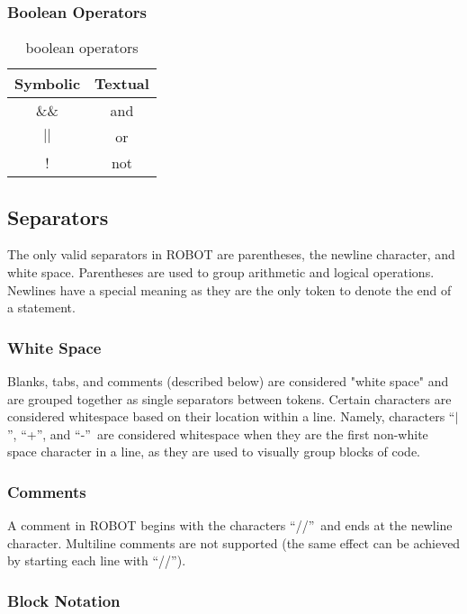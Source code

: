 \documentclass[a4paper]{article}
\newcommand{\og}{``}
\newcommand{\fg}{''}
\begin{document}
\pagebreak

\subsubsection{Boolean Operators}

\begin{table}[h!]
	\centering
	\begin{tabular}{|c|c|}
		\hline
		Symbolic & Textual\\
		\hline
		\&\& & and\\
		\hline
		$\vert\vert$ & or\\
		\hline
		! & not\\
		\hline
	\end{tabular}
	\caption{boolean operators}
\end{table}

\subsection{Separators}

The only valid separators in ROBOT are parentheses, the newline character, and white space.  Parentheses are used to group arithmetic and logical operations.  Newlines have a special meaning as they are the only token to denote the end of a statement.

\subsubsection{White Space}

Blanks, tabs, and comments (described below) are considered "white space" and are grouped together as single separators between tokens.  Certain characters are considered whitespace based on their location within a line.  Namely, characters \og$\vert$\fg, \og+\fg, and \og-\fg\ are considered whitespace when they are the first non-white space character in a line, as they are used to visually group blocks of code.

\subsubsection{Comments}

A comment in ROBOT begins with the characters \og//\fg\ and ends at the newline character.  Multiline comments are not supported (the same effect can be achieved by starting each line with \og//\fg).

\subsubsection{Block Notation}
\end{document}
